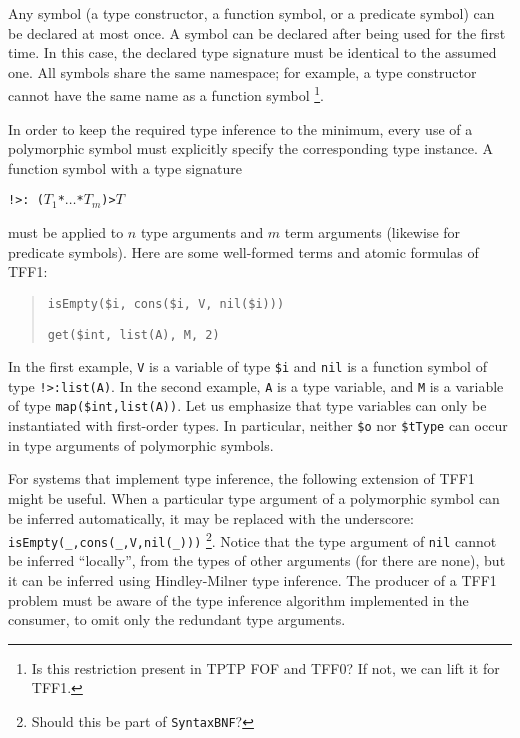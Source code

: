 Any symbol (a type constructor, a function symbol, or a predicate symbol)
can be declared at most once. A symbol can be declared after being used
for the first time. In this case, the declared type signature must be
identical to the assumed one. All symbols share the same namespace; for
example, a type constructor cannot have the same name as a function symbol%
\footnote{Is this restriction present in TPTP FOF and TFF0? If not, we can
lift it for TFF1.}.

 In order to keep
the required type inference to the minimum, every use of a polymorphic
symbol must explicitly specify the corresponding type instance.
A function symbol with a type signature
\begin{center}
{\tt !>\;:\;%
($T_1$\;*\;${\dots}$\;*\;$T_m$)\;>\;$T$}
\end{center}
must be applied to $n$ type arguments and $m$ term arguments
(likewise for predicate symbols). Here are some well-formed
terms and atomic formulas of TFF1:
\begin{quote}
\verb+isEmpty($i, cons($i, V, nil($i)))+
\par\smallskip
\verb+get($int, list(A), M, 2)+
\end{quote}
In the first example, {\tt V} is a variable of type {\tt \$i}
and {\tt nil} is a function
symbol of type {\tt !>\;[A:\$tType]\;:\;list(A)}. In the second
example, {\tt A} is a type variable, and {\tt M} is a variable
of type {\tt map(\$int,list(A))}. Let us emphasize that type
variables can only be instantiated with first-order types.
In particular, neither \verb+$o+ nor \verb+$tType+ can occur
in type arguments of polymorphic symbols.

For systems that implement type inference, the following extension
of TFF1 might be useful. When a particular type argument of
a polymorphic symbol can be inferred automatically, it may be
replaced with the underscore: \verb+isEmpty(_,cons(_,V,nil(_)))+%
\footnote{Should this be part of {\tt SyntaxBNF}?}.
Notice that the type argument of {\tt nil} cannot be inferred
``locally'', from the types of other arguments (for there are none),
but it can be inferred using Hindley-Milner type inference.
The producer of a TFF1 problem must be aware of the type
inference algorithm implemented in the consumer, to omit
only the redundant type arguments.

